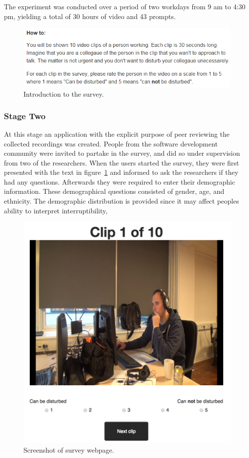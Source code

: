\documentclass{sigchi}
\begin{document}
The experiment was conducted over a period of two workdays from 9 am to 4:30 pm, yielding a total of 30 hours of video and 43 prompts.

\begin{figure}
  \centering
  \includegraphics[width=\columnwidth]{figures/survey_introduction.png}
  \caption{Introduction to the survey.}
  \label{fig:survey_intro}
\end{figure}

\subsubsection{Stage Two}
At this stage an application with the explicit purpose of peer reviewing the collected recordings was created.
People from the software development community were invited to partake in the survey, and did so under supervision from two of the researchers.
When the users started the survey, they were first presented with the text in figure~\ref{fig:survey_intro} and informed to ask the researchers if they had any questions.
Afterwards they were required to enter their demographic information.
These demographical questions consisted of gender, age, and ethnicity.
The demographic distribution is provided since it may affect peoples ability to interpret interruptibility,

\begin{figure}
  \centering
  \includegraphics[width=\columnwidth]{figures/webpage_screenshot.png}
  \caption{Screenshot of survey webpage.}
  \label{fig:webpage}
\end{figure}
\end{document}
